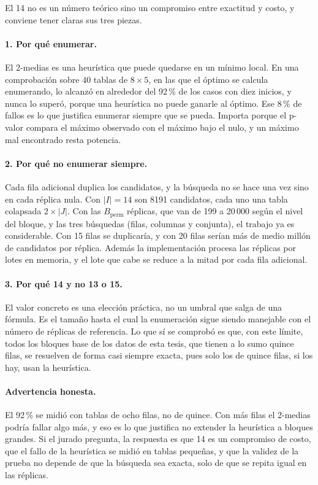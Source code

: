 \documentclass[11pt,a4paper]{article}
\begin{document}
El 14 no es un número teórico sino un compromiso entre exactitud y costo, y
conviene tener claras sus tres piezas.

\paragraph{1. Por qué enumerar.} El 2-medias es una heurística que puede quedarse en
un mínimo local. En una comprobación sobre 40 tablas de $8\times5$, en las que el
óptimo se calcula enumerando, lo alcanzó en alrededor del 92\,\% de los casos con
diez inicios, y nunca lo superó, porque una heurística no puede ganarle al óptimo.
Ese 8\,\% de fallos es lo que justifica enumerar siempre que se pueda. Importa
porque el p-valor compara el máximo observado con el máximo bajo el nulo, y un
máximo mal encontrado resta potencia.

\paragraph{2. Por qué no enumerar siempre.} Cada fila adicional duplica los
candidatos, y la búsqueda no se hace una vez sino en cada réplica nula. Con
$|I|=14$ son 8191 candidatos, cada uno una tabla colapsada $2\times|J|$. Con las
$B_{\mathrm{perm}}$ réplicas, que van de 199 a 20\,000 según el nivel del bloque, y
las tres búsquedas (filas, columnas y conjunta), el trabajo ya es considerable. Con
15 filas se duplicaría, y con 20 filas serían más de medio millón de candidatos por
réplica. Además la implementación procesa las réplicas por lotes en memoria, y el
lote que cabe se reduce a la mitad por cada fila adicional.

\paragraph{3. Por qué 14 y no 13 o 15.} El valor concreto es una elección práctica,
no un umbral que salga de una fórmula. Es el tamaño hasta el cual la enumeración
sigue siendo manejable con el número de réplicas de referencia. Lo que sí se
comprobó es que, con este límite, todos los bloques base de los datos de esta tesis,
que tienen a lo sumo quince filas, se resuelven de forma casi siempre exacta, pues
solo los de quince filas, si los hay, usan la heurística.

\paragraph{Advertencia honesta.} El 92\,\% se midió con tablas de ocho filas, no
de quince. Con más filas el 2-medias podría fallar algo más, y eso es lo que
justifica no extender la heurística a bloques grandes. Si el jurado pregunta, la
respuesta es que 14 es un compromiso de costo, que el fallo de la heurística se
midió en tablas pequeñas, y que la validez de la prueba no depende de que la búsqueda
sea exacta, solo de que se repita igual en las réplicas.
\end{document}
